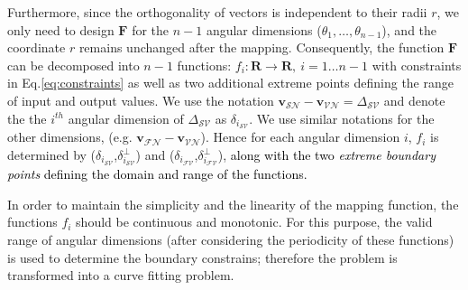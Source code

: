 Furthermore, since the orthogonality of vectors is independent to their radii $r$, we only need to design $\mathbf{F}$ for the $n-1$ angular dimensions ($\theta_1,\dots,\theta_{n-1}$), and the coordinate $r$ remains unchanged after the mapping. Consequently, the function $\mathbf{F}$ can be decomposed into $n-1$ functions: $f_i: \mathbf{R}\to \mathbf{R},~i=1\dots n-1$ with constraints in Eq.\ref{eq:constraints} as well as two additional extreme points defining the range of input and output values. %
We use the notation $\mathbf{v}_{\mathcal{SN}} - \mathbf{v}_{\mathcal{VN}} = \Delta_{\mathcal{SV}}$ and denote the the $i^{th}$ angular dimension of $\Delta_{\mathcal{SV}}$ as $\delta_{i_{{\mathcal{SV}}}}$. We use similar notations for the other dimensions, (e.g. $\mathbf{v}_{\mathcal{FN}} - \mathbf{v}_{\mathcal{VN}}$). %
Hence for each angular dimension $i$, $f_i$ is determined by ($\delta_{i_{{\mathcal{SV}}}}$,$\delta^{\perp}_{i_{{\mathcal{SV}}}}$) and ($\delta_{i_{{\mathcal{FV}}}}$,$\delta^{\perp}_{i_{{\mathcal{FV}}}}$), \textcolor{black}{along with the two \textit{extreme boundary points} defining the domain and range of the functions.}




In order to maintain the simplicity and the linearity of the mapping function, the functions $f_i$ should be continuous and monotonic. For this purpose, the %
valid range of angular dimensions (after considering the periodicity of these functions) is used to determine the boundary constrains; therefore the problem is transformed into a curve fitting problem. 

